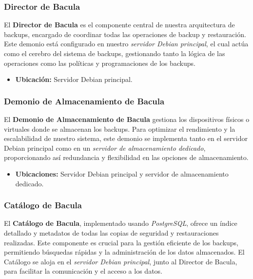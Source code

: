 \subsubsection{Director de Bacula}

El \textbf{Director de Bacula} es el componente central de nuestra arquitectura de backups, encargado de coordinar todas las operaciones de backup y restauración. Este demonio está configurado en nuestro \textit{servidor Debian principal}, el cual actúa como el cerebro del sistema de backups, gestionando tanto la lógica de las operaciones como las políticas y programaciones de los backups.

\begin{itemize}
    \item \textbf{Ubicación:} Servidor Debian principal.
\end{itemize}

\subsubsection{Demonio de Almacenamiento de Bacula}

El \textbf{Demonio de Almacenamiento de Bacula} gestiona los dispositivos físicos o virtuales donde se almacenan los backups. Para optimizar el rendimiento y la escalabilidad de nuestro sistema, este demonio se implementa tanto en el servidor Debian principal como en un \textit{servidor de almacenamiento dedicado}, proporcionando así redundancia y flexibilidad en las opciones de almacenamiento.

\begin{itemize}
    \item \textbf{Ubicaciones:} Servidor Debian principal y servidor de almacenamiento dedicado.
\end{itemize}

\subsubsection{Catálogo de Bacula}

El \textbf{Catálogo de Bacula}, implementado usando \textit{PostgreSQL}, ofrece un índice detallado y metadatos de todas las copias de seguridad y restauraciones realizadas. Este componente es crucial para la gestión eficiente de los backups, permitiendo búsquedas rápidas y la administración de los datos almacenados. El Catálogo se aloja en el \textit{servidor Debian principal}, junto al Director de Bacula, para facilitar la comunicación y el acceso a los datos.

